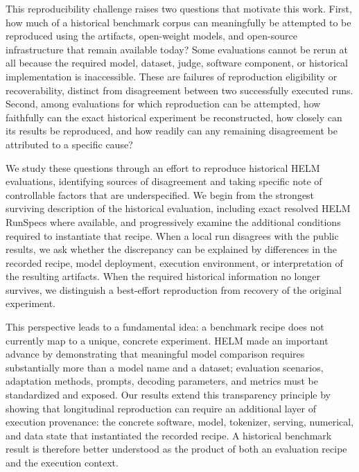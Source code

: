 This reproducibility challenge raises two questions that motivate this work. First, how much of a historical benchmark corpus can meaningfully be attempted to be reproduced using the artifacts, open-weight models, and open-source infrastructure that remain available today? Some evaluations cannot be rerun at all because the required model, dataset, judge, software component, or historical implementation is inaccessible. These are failures of reproduction eligibility or recoverability, distinct from disagreement between two successfully executed runs. Second, among evaluations for which reproduction can be attempted, how faithfully can the exact historical experiment be reconstructed, how closely can its results be reproduced, and how readily can any remaining disagreement be attributed to a specific cause?

We study these questions through an effort to reproduce historical HELM evaluations, identifying sources of disagreement and taking specific note of controllable factors that are underspecified. We begin from the strongest surviving description of the historical evaluation, including exact resolved HELM RunSpecs where available, and progressively examine the additional conditions required to instantiate that recipe. When a local run disagrees with the public results, we ask whether the discrepancy can be explained by differences in the recorded recipe, model deployment, execution environment, or interpretation of the resulting artifacts. When the required historical information no longer survives, we distinguish a best-effort reproduction from recovery of the original experiment.

This perspective leads to a fundamental idea: a benchmark recipe does not currently map to a unique, concrete experiment. HELM made an important advance by demonstrating that meaningful model comparison requires substantially more than a model name and a dataset; evaluation scenarios, adaptation methods, prompts, decoding parameters, and metrics must be standardized and exposed. Our results extend this transparency principle by showing that longitudinal reproduction can require an additional layer of execution provenance: the concrete software, model, tokenizer, serving, numerical, and data state that instantiated the recorded recipe. A historical benchmark result is therefore better understood as the product of both an evaluation recipe and the execution context.

